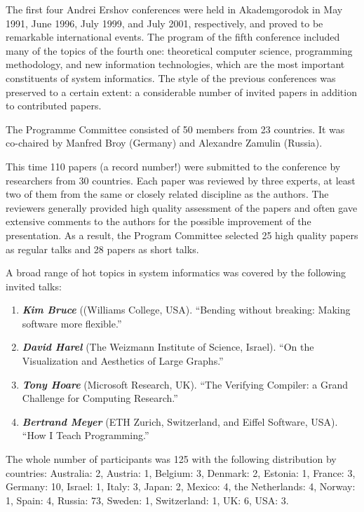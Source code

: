\documentclass[final]{beatcs}
\begin{document}
 The first four Andrei Ershov conferences were held in Akademgorodok
 in May 1991,  June 1996, July 1999, and July 2001, respectively, and
 proved to be remarkable international events. The program of the
 fifth conference included many of the topics of the fourth one:
 theoretical computer science, programming methodology, and new
 information technologies, which are the most important constituents
 of system informatics. The style of the previous conferences was
 preserved to a certain extent: a considerable number of invited
 papers in addition to contributed papers.  

 The Programme Committee consisted of 50 members from 23
 countries. It was co-chaired by Manfred Broy (Germany) and Alexandre
 Zamulin (Russia).

 This time 110 papers (a record number!) were submitted to the
 conference by researchers from 30 countries. Each paper was reviewed
 by three experts, at least two of them from the same or closely
 related discipline as the authors. The reviewers generally provided
 high quality assessment of the papers and often gave extensive
 comments to the authors for the possible improvement of the
 presentation. As a result, the Program Committee selected 25 high
 quality papers as regular talks and 28 papers as short talks.  

 A broad range of hot topics in system informatics was covered by the
 following invited talks: 
\begin{enumerate}\itemsep0pt plus 4pt minus 2pt
 \item \textbf{\textit{Kim Bruce}} ((Williams College, USA). 
        ``Bending without breaking: Making software more flexible.''   
 \item\textbf{\textit{David Harel}} (The Weizmann Institute of Science,
      Israel). ``On the Visualization and Aesthetics of Large
      Graphs.'' 
\item\textbf{\textit{Tony Hoare}} (Microsoft Research, UK). 
        ``The Verifying Compiler: a Grand Challenge for Computing
        Research.''
 \item\textbf{\textit{Bertrand Meyer}}  (ETH Zurich, Switzerland, and
    Eiffel Software, USA). ``How I Teach Programming.''
\end{enumerate}

 The whole number of participants was 125 with the following
 distribution by countries: 
        Australia: 2, Austria: 1, Belgium: 3, Denmark: 2, Estonia: 1,
        France: 3, Germany: 10, Israel: 1, Italy: 3, Japan: 2, 
        Mexico: 4, the Netherlands: 4, Norway: 1, Spain: 4, 
        Russia: 73, Sweden: 1, Switzerland: 1, UK: 6, USA: 3. 
\end{document}
